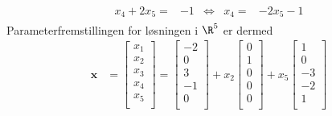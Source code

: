 \begin{eks}
\begin{align*}
\begin{array}{rrcll}
x_4+2x_5    =&-1   &\iff &x_4   =&-2x_5-1 
\end{array}
\end{align*}
%
Parameterfremstillingen for løsningen i $\R^5$ er dermed
%
  \begin{align*}
    \mathbf{x} &= \begin{bmatrix}
           x_{1} \\
           x_{2} \\
           x_{3} \\
           x_{4} \\
           x_{5} \\
         \end{bmatrix} 
         = \begin{bmatrix}
           -2 \\
           0 \\
           3 \\
           -1 \\
           0 \\
         \end{bmatrix}
         +x_2 \begin{bmatrix}
           0 \\
           1 \\
           0 \\
           0 \\
           0 \\
         \end{bmatrix}
         +x_5 \begin{bmatrix}
           1 \\
           0 \\
           -3 \\
           -2 \\
           1 \\
         \end{bmatrix}
  \end{align*} 
%
\label{eks_gauss}
%
%
\end{eks}
%
%
